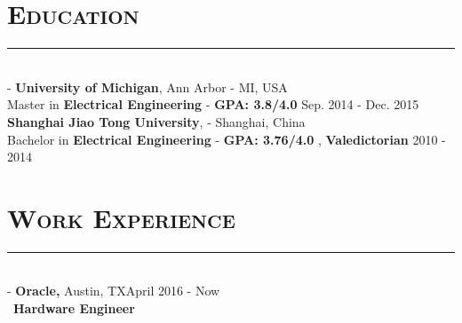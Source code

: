 \documentclass[11pt]{res}
\newcommand{\style}[1]{\color{Blue}\large\textsc{#1}}
\begin{document}
\begin{resume}
\section{\style{Education}}
\vspace{-10pt}
\rule{18cm}{0.5mm}\\
 -\sectionwidth \resumewidth
{\textbf {University of Michigan}, Ann Arbor - MI, USA \\}
{Master in \textbf{Electrical Engineering} - \textbf{GPA: 3.8/4.0}    \hfill Sep. 2014 - Dec. 2015\hspace{-0.58in} \vspace{-0.8mm}\\}
{\textbf {Shanghai Jiao Tong University},  - Shanghai, China \\}
{Bachelor in \textbf{Electrical Engineering} - \textbf{GPA: 3.76/4.0} , \textbf{Valedictorian}   \hfill 2010 - 2014\hspace{-0.58in} \vspace{-0.8mm}\\}
  
 \vspace{-25pt}
\section{\style{Work Experience}}

\vspace{-10pt}
\rule{18cm}{0.5mm}\\
 -\sectionwidth \resumewidth
{\textbf{Oracle,}  Austin, TX\hfill April 2016 - Now} \hspace{-0.58in}\vspace{-0mm}\\\
  \textbf{Hardware Engineer} \\
 \vspace{-14pt}


\end{resume}
\end{document}
